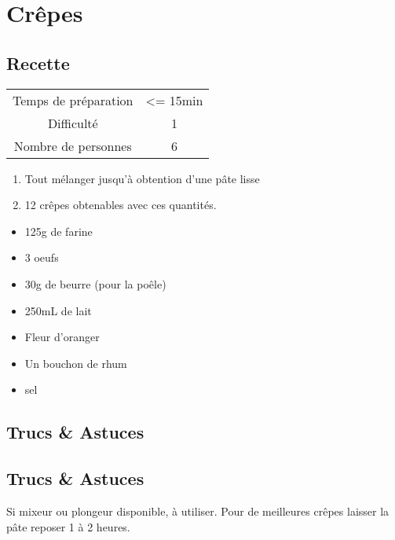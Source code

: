 \newpage
\section{Crêpes}
    \label{sec:Crêpes}
    \subsection{Recette}
    \vspace{1cm}


    \begin{center}
        \begin{tabular}{c|c}
            Temps de préparation & <= 15min \\
            Difficulté & 1 \\
            Nombre de personnes & 6 
        \end{tabular}
    \end{center}{}

    \vspace{1cm}
    \hline
    \vspace{1cm}

    \begin{minipage}{.7\textwidth}
        \begin{enumerate}
            \item Tout mélanger jusqu'à obtention d'une pâte lisse
	    \item 12 crêpes obtenables avec ces quantités.

        \end{enumerate}
    \end{minipage}
    \begin{minipage}{.3\textwidth}
        \begin{flushleft}
        \begin{itemize}
            \item 125g de farine
	    \item 3 oeufs
	    \item 30g de beurre (pour la poêle)
	    \item 250mL de lait
	    \item Fleur d'oranger
	    \item Un bouchon de rhum
	    \item sel

        \end{itemize}
        \end{flushleft}
    \end{minipage}
    
    \vspace{1cm}
    \hline
    \vspace{1cm}
    
    \subsection{Trucs \& Astuces}
        \subsection{Trucs \& Astuces}
	Si mixeur ou plongeur disponible, à utiliser. Pour de meilleures crêpes laisser la pâte reposer 1 à 2 heures.
